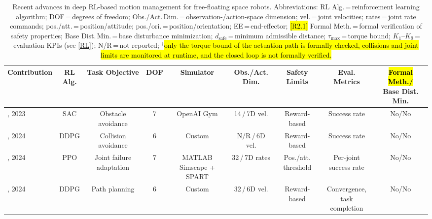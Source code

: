 \documentclass{ieeeaccess}
\newcommand{\hlone}[1]{{\sethlcolor{rone}\hl{#1}}}
\begin{document}
\begin{table}[!t]
	\centering
	\caption{Recent advances in deep RL-based motion management for free-floating space robots.
  Abbreviations: RL Alg.\,=\,reinforcement learning algorithm; DOF\,=\,degrees of freedom;
  Obs./Act.\,Dim.\,=\,observation-/action-space dimension; vel.\,=\,joint velocities; rates\,=\,joint
  rate commands; pos./att.\,=\,position/attitude; pos./ori.\,=\,position/orientation;
  EE\,=\,end-effector; \hlone{[R2.1]} Formal Meth.\,=\,formal verification of safety properties;
  Base Dist.\,Min.\,=\,base disturbance minimization; $d_{\mathrm{safe}}$\,=\,minimum admissible distance;
  $\tau_{\max}$\,=\,torque bound; $K_1$--$K_9$\,=\,evaluation KPIs (see \cref{RL}); N/R\,=\,not reported;
  $^{\dagger}$\hlone{only the torque bound of the actuation path is formally checked, collisions and joint
  limits are monitored at runtime, and the closed loop is not formally verified.}}
	\label{tab:sample}
	\scriptsize
	\renewcommand{\arraystretch}{1.25}
	\begin{tabular}{lcccccccc}
		\toprule
		\textbf{Contribution} & \makecell{\textbf{RL}\\\textbf{Alg.}} & \textbf{Task Objective} &
		  \textbf{DOF} & \textbf{Simulator} & \makecell{\textbf{Obs./Act.}\\\textbf{Dim.}} &
		  \makecell{\textbf{Safety}\\\textbf{Limits}} & \makecell{\textbf{Eval.}\\\textbf{Metrics}} &
		  \makecell{\textbf{\hlone{Formal Meth./}}\\\textbf{Base Dist. Min.}} \\
		\midrule
		\cite{huang2023obstacle}, 2023 & SAC & Obstacle avoidance & 7 & OpenAI Gym & 14\,/\,7D vel. &
		  Reward-based & Success rate & No/No \\
		\cite{al2024reinforcement}, 2024 & DDPG & Collision avoidance & 6 & Custom & N/R\,/\,6D vel. &
		  Reward-based & Success rate & No/No \\
		\cite{d2024failure}, 2024 & PPO & \makecell{Joint failure\\adaptation} & 7 &
		  \makecell{MATLAB\\Simscape + SPART} & 32\,/\,7D rates & \makecell{Pos./att.\\threshold} &
		  \makecell{Per-joint\\success rate} & No/No \\
		\cite{al2024path}, 2024 & DDPG & Path planning & 6 & Custom & 32\,/\,6D vel. & Reward-based &
		  \makecell{Convergence,\\task completion} & No/No \\

\end{tabular}
\end{table}
\end{document}

